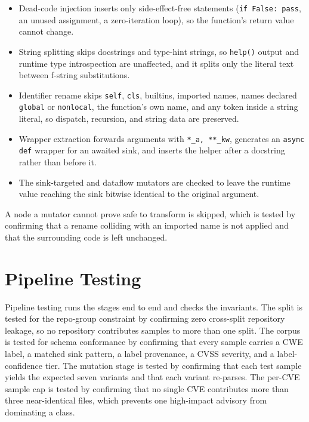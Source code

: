 \begin{itemize}
  \item Dead-code injection inserts only side-effect-free statements
    (\texttt{if False: pass}, an unused assignment, a zero-iteration loop), so
    the function's return value cannot change.
  \item String splitting skips docstrings and type-hint strings, so
    \texttt{help()} output and runtime type introspection are unaffected, and it
    splits only the literal text between f-string substitutions.
  \item Identifier rename skips \texttt{self}, \texttt{cls}, builtins, imported
    names, names declared \texttt{global} or \texttt{nonlocal}, the function's
    own name, and any token inside a string literal, so dispatch, recursion, and
    string data are preserved.
  \item Wrapper extraction forwards arguments with \texttt{*\_a, **\_kw},
    generates an \texttt{async def} wrapper for an awaited sink, and inserts the
    helper after a docstring rather than before it.
  \item The sink-targeted and dataflow mutators are checked to leave the runtime
    value reaching the sink bitwise identical to the original argument.
\end{itemize}

A node a mutator cannot prove safe to transform is skipped, which is tested by
confirming that a rename colliding with an imported name is not applied and that
the surrounding code is left unchanged.

\section{Pipeline Testing}

Pipeline testing runs the stages end to end and checks the invariants. The split
is tested for the repo-group constraint by confirming zero cross-split
repository leakage, so no repository contributes samples to more than one split.
The corpus is tested for schema conformance by confirming that every sample
carries a CWE label, a matched sink pattern, a label provenance, a CVSS severity,
and a label-confidence tier. The mutation stage is tested by confirming that each
test sample yields the expected seven variants and that each variant re-parses.
The per-CVE sample cap is tested by confirming that no single CVE contributes
more than three near-identical files, which prevents one high-impact advisory
from dominating a class.

